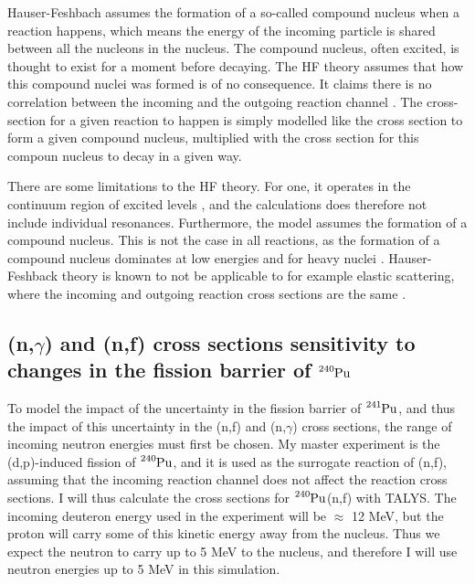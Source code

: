 \documentclass[]{article}
\begin{document}
 \noindent Hauser-Feshbach assumes the formation of a so-called compound nucleus when a reaction happens, which means the energy of the incoming particle is shared between all the nucleons in the nucleus. The compound nucleus, often excited, is thought to exist for a moment before decaying. The HF theory assumes that how this compound nuclei was formed is of no consequence. It claims there is no correlation between the incoming and the outgoing reaction channel \cite{Goriely2017_OMP}. The cross-section for a given reaction to happen is simply modelled like the cross section to form a given compound nucleus, multiplied with the cross section for this compoun nucleus to decay in a given way. 
\par 
\vspace{3mm}

 \noindent There are some limitations to the HF theory. For one, it operates in the continuum region of excited levels \cite{Goriely2017_OMP}, and the calculations does therefore not include individual resonances. Furthermore, the model assumes the formation of a compound nucleus. This is not the case in all reactions, as the formation of a compound nucleus dominates at low energies and for heavy nuclei \cite{Goriely2017_OMP}. Hauser-Feshback theory is known to not be applicable to for example elastic scattering, where the incoming and outgoing reaction cross sections are the same  \cite{Goriely2017_OMP}.


\subsection{(n,$\gamma$) and (n,f) cross sections sensitivity to changes in the fission barrier of $\ce{^{240}Pu}$}


To model the impact of the uncertainty in the fission barrier of $\ce{^{241}Pu}$, and thus the impact of this uncertainty in the (n,f) and (n,$\gamma$) cross sections, the range of incoming neutron energies must first be chosen. My master experiment is the (d,p)-induced fission of $\ce{^{240}Pu}$, and it is used as the surrogate reaction of (n,f), assuming that the incoming reaction channel does not affect the reaction cross sections. I will thus calculate the cross sections for $\ce{^{240}Pu}$(n,f) with TALYS. The incoming deuteron energy used in the experiment will be $\approx$ 12 MeV, but the proton will carry some of this kinetic energy away from the nucleus. Thus we expect the neutron to carry up to 5 MeV to the nucleus, and therefore I will use neutron energies up to 5 MeV in this simulation. 
\par 
\vspace{3mm}
\end{document}
